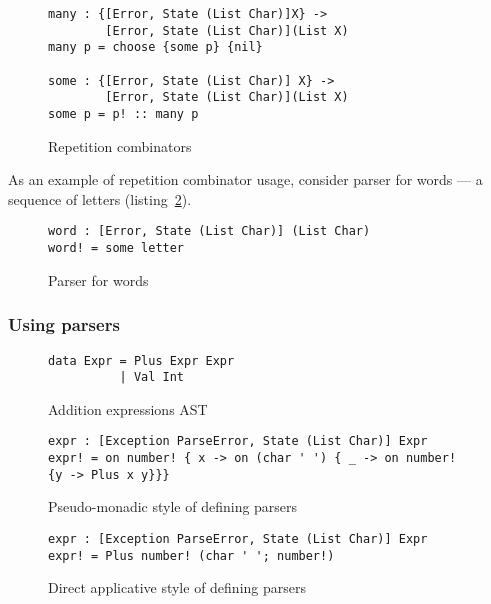     \begin{figure}[h]
    \begin{lstlisting}
many : {[Error, State (List Char)]X} ->
        [Error, State (List Char)](List X)
many p = choose {some p} {nil}

some : {[Error, State (List Char)] X} ->
        [Error, State (List Char)](List X)
some p = p! :: many p
    \end{lstlisting}
    \caption{Repetition combinators}
    \label{listing:parserManyCombo}
    \end{figure}

    As an example of repetition combinator usage, consider parser for words ---
    a sequence of letters (listing~\ref{listing:parserWordCombo}).

    \begin{figure}[h]
    \begin{lstlisting}
word : [Error, State (List Char)] (List Char)
word! = some letter
    \end{lstlisting}
    \caption{Parser for words}
    \label{listing:parserWordCombo}
    \end{figure}

    \subsubsection{Using parsers}

      \begin{figure}[h]
      \begin{lstlisting}
data Expr = Plus Expr Expr
          | Val Int
      \end{lstlisting}
      \caption{Addition expressions AST}
      \label{listing:parserExprCombo}
      \end{figure}

      \begin{figure}[h]
      \begin{lstlisting}
expr : [Exception ParseError, State (List Char)] Expr
expr! = on number! { x -> on (char ' ') { _ -> on number! {y -> Plus x y}}}
      \end{lstlisting}
      \caption{Pseudo-monadic style of defining parsers}
      \label{listing:parserExprMonCombo}
      \end{figure}

      \begin{figure}[h]
      \begin{lstlisting}
expr : [Exception ParseError, State (List Char)] Expr
expr! = Plus number! (char ' '; number!)
      \end{lstlisting}
      \caption{Direct applicative style of defining parsers}
      \label{listing:parserExprAppCombo}
      \end{figure}

